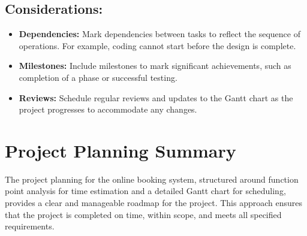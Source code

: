 \subsection*{Considerations:}
\begin{itemize}
    \item \textbf{Dependencies:} Mark dependencies between tasks to reflect the sequence of operations. For example, coding cannot start before the design is complete.
    \item \textbf{Milestones:} Include milestones to mark significant achievements, such as completion of a phase or successful testing.
    \item \textbf{Reviews:} Schedule regular reviews and updates to the Gantt chart as the project progresses to accommodate any changes.
\end{itemize}

\section{Project Planning Summary}
The project planning for the online booking system, structured around function point analysis for time estimation and a detailed Gantt chart for scheduling, provides a clear and manageable roadmap for the project. This approach ensures that the project is completed on time, within scope, and meets all specified requirements.